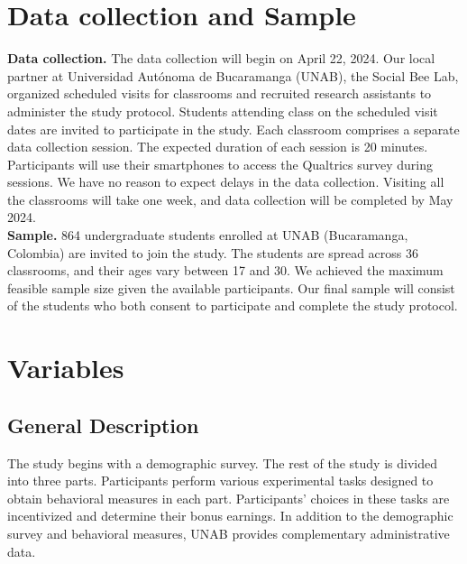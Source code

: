 \documentclass[11pt,a4paper,oneside]{article}
\begin{document}
\section{Data collection and Sample}
\textbf{Data collection.} The data collection will begin on April 22, 2024. Our local partner at Universidad Autónoma de Bucaramanga (UNAB), the Social Bee Lab, organized scheduled visits for classrooms and recruited research assistants to administer the study protocol. Students attending class on the scheduled visit dates are invited to participate in the study. Each classroom comprises a separate data collection session. The expected duration of each session is 20 minutes. Participants will use their smartphones to access the Qualtrics survey during sessions. We have no reason to expect delays in the data collection. Visiting all the classrooms will take one week, and data collection will be completed by May 2024.\medskip \\
\textbf{Sample.} 864 undergraduate students enrolled at UNAB (Bucaramanga, Colombia) are invited to join the study. The students are spread across 36 classrooms, and their ages vary between 17 and 30. We achieved the maximum feasible sample size given the available participants. Our final sample will consist of the students who both consent to participate and complete the study protocol.

\section{Variables}

\subsection{General Description}
The study begins with a demographic survey. The rest of the study is divided into three parts. Participants perform various experimental tasks designed to obtain behavioral measures in each part. Participants’ choices in these tasks are incentivized and determine their bonus earnings. In addition to the demographic survey and behavioral measures, UNAB provides complementary administrative data.
\end{document}
